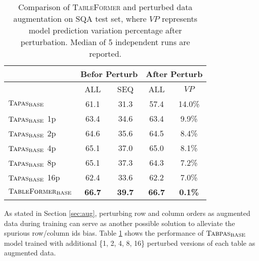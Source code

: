 \documentclass[11pt]{article}
\begin{document}
\begin{table}
\footnotesize
\centering
\begin{tabular}{lcc|cc}
\toprule
                                      & \multicolumn{2}{c|}{\textbf{Befor Perturb}}        & \multicolumn{2}{c}{\textbf{After Perturb}}       \\\midrule
                                            & ALL      & SEQ      & ALL      & $VP$             \\\midrule
$\textsc{Tapas}_{\text{BASE}}$                                     & 61.1          & 31.3          & 57.4           & 14.0\%         \\\midrule
$\textsc{Tapas}_{\text{BASE}}$ 1p                                  & 63.4          & 34.6          & 63.4                                                         & 9.9\%          \\
$\textsc{Tapas}_{\text{BASE}}$  2p                                 & 64.6          & 35.6          & 64.5                                 & 8.4\%          \\
$\textsc{Tapas}_{\text{BASE}}$  4p                                 & 65.1          & 37.0          & 65.0                                      & 8.1\%          \\
$\textsc{Tapas}_{\text{BASE}}$  8p          & 65.1          & 37.3          & 64.3                                                      & 7.2\%          \\
$\textsc{Tapas}_{\text{BASE}}$  16p                                 & 62.4          & 33.6          & 62.2                           & 7.0\%          \\\midrule
$\textsc{TableFormer}_{\text{BASE}}$                       & \textbf{66.7} & \textbf{39.7} & \textbf{66.7}        & \textbf{0.1\%}
\\\bottomrule
\end{tabular}
\caption{\label{tab:widgets6}Comparison of \textsc{TableFormer} and perturbed data augmentation on SQA test set, where $VP$ represents model prediction variation percentage after perturbation. Median of 5 independent runs are reported.}
\end{table}

As stated in Section \ref{sec:aug},  perturbing row and column orders as augmented data during training can serve as another possible solution to alleviate the spurious row/column ids bias. Table \ref{tab:widgets6} shows the performance of $\textsc{Tabpas}_{\text{BASE}}$ model trained with additional \{1, 2, 4, 8, 16\} perturbed versions of each table as augmented data. 
\end{document}
